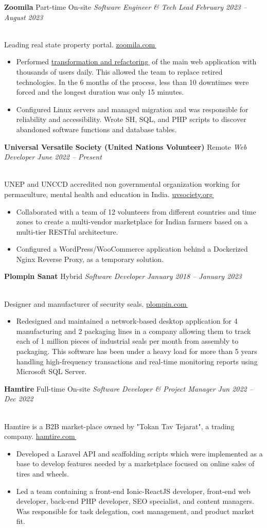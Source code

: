 \documentclass[11pt,a4paper]{article}
\makeatletter
\let\orighref\href
\renewcommand{\href}[2]{\orighref{#1}{#2\,{\textsuperscript{\tiny{\textcolor{heritagered}{\faExternalLink}}}}}}
\newcommand{\deemph}[1]{{\color{gray}#1}}
\newcommand{\info}[1]{
    \\
    \deemph{
        \faInfoCircle
        \hspace{0.15in}
         #1
     }
     \vspace{-7pt}
}
\newcommand{\resumeItem}[1]{
  \item\small{
    {#1 \vspace{-2pt}}
  }
}
\newcommand{\resumeSubheading}[4]{
  \vspace{-2pt}\item
      \textbf{#1} \small\deemph{#2}
      \textit{\small #3} \hfill \textit{\small\deemph{\textcolor{marineblue}{#4}}}
    \vspace{0pt}
}
\newcommand{\resumeItemListStart}{\begin{itemize}}
\newcommand{\resumeItemListEnd}{\end{itemize}\vspace{-5pt}}
\makeatother
\begin{document}
    \resumeSubheading
      {Zoomila}{Part-time On-site}
      {Software Engineer \& Tech Lead}{February 2023 -- August 2023}
      \info{Leading real state property portal. \href{https://zoomila.com}{zoomila.com}}
      \resumeItemListStart
        \resumeItem{Performed \href{https://tayyebi.medium.com/breaking-the-bad-transforming-monolithic-applications-to-containers-8a769af8cf26}{transformation and refactoring} of the main web application with thousands of users daily. This allowed the team to replace retired technologies. In the 6 months of the process, less than 10 downtimes were forced and the longest duration was only 15 minutes.}
        \resumeItem{Configured Linux servers and managed migration and was responsible for reliability and accessibility. Wrote SH, SQL, and PHP scripts to discover abandoned software functions and database tables. }
        \resumeItemListEnd
        
    \resumeSubheading
      {Universal Versatile Society (United Nations Volunteer)}{Remote}
      {Web Developer}{June 2022 -- Present}
      \info{UNEP and UNCCD accredited non governmental organization working for permaculture, mental health and education in India. \href{https://uvsociety.org}{uvsociety.org}}
      \resumeItemListStart
        \resumeItem{Collaborated with a team of 12 volunteers from different countries and time zones to create a multi-vendor marketplace for Indian farmers based on a multi-tier RESTful architecture.}
        \resumeItem{Configured a WordPress/WooCommerce application behind a Dockerized Nginx Reverse Proxy, as a temporary solution.}
      \resumeItemListEnd

    \resumeSubheading
      {Plompin Sanat}{Hybrid}
      {Software Developer}{January 2018 -- January 2023}
      \info{Designer and manufacturer of security seals. \href{http://en.plompin.com}{plompin.com}}
      \resumeItemListStart
        \resumeItem{Redesigned and maintained a network-based desktop application for 4 manufacturing and 2 packaging lines in a company allowing them to track each of 1 million pieces of industrial seals per month from assembly to packaging. This software has been under a heavy load for more than 5 years handling high-frequency transactions and real-time monitoring reports using Microsoft SQL Server.}
        \resumeItemListEnd

    \resumeSubheading
      {Hamtire}{Full-time On-site}
      {Software Developer \& Project Manager}{Jun 2022 -- Dec 2022}
      \info{Hamtire is a B2B market-place owned by "Tokan Tav Tejarat", a trading company. \href{https://hamtire.com}{hamtire.com}}
      \resumeItemListStart
        \resumeItem{Developed a Laravel API and scaffolding scripts which were implemented as a base to develop features needed by a marketplace focused on online sales of tires and wheels. }
        \resumeItem{Led a team containing a front-end Ionic-ReactJS developer, front-end web developer, back-end PHP developer, SEO specialist, and content managers. Was responsible for task delegation, cost management, and product market fit.}
        \resumeItemListEnd
\end{document}
